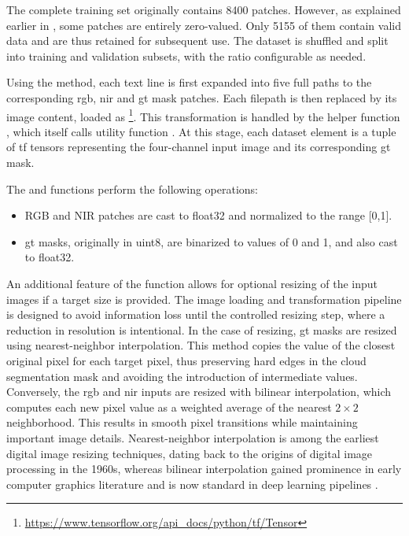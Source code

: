 {The complete training set originally contains 8400 patches. However, as explained earlier in , some patches are entirely zero-valued.
Only 5155 of them contain valid data and are thus retained for subsequent use.
The dataset is shuffled and split into training and validation subsets, with the ratio configurable as needed.

Using the  method, each text line is first expanded into five full paths to the corresponding \gls{rgb}, \gls{nir} and \gls{gt} mask patches.
Each filepath is then replaced by its image content, loaded as \footnote{\url{https://www.tensorflow.org/api_docs/python/tf/Tensor}}.
This transformation is handled by the helper function , which itself calls utility function .
At this stage, each dataset element is a tuple of \gls{tf} tensors representing the four-channel input image and its corresponding \gls{gt} mask.

The  and  functions perform the following operations:

\begin{itemize}
    \item RGB and NIR patches are cast to \gls{float32} and normalized to the range [0,1].
    \item \gls{gt} masks, originally in \gls{uint8}, are binarized to values of 0 and 1, and also cast to \gls{float32}.
\end{itemize}

An additional feature of the  function allows for optional resizing of the input images if a target size is provided.
The image loading and transformation pipeline is designed to avoid information loss until the controlled resizing step, where a reduction in resolution is intentional.
In the case of resizing, \gls{gt} masks are resized using nearest-neighbor interpolation. This method copies the value of the closest original pixel for each target pixel,
thus preserving hard edges in the cloud segmentation mask and avoiding the introduction of intermediate values.
Conversely, the \gls{rgb} and \gls{nir} inputs are resized with bilinear interpolation,
which computes each new pixel value as a weighted average of the nearest $2\times2$ neighborhood. This results in smooth pixel transitions while maintaining important image details.
Nearest-neighbor interpolation is among the earliest digital image resizing techniques, dating back to the origins of digital image processing in the 1960s,
whereas bilinear interpolation gained prominence in early computer graphics literature and is now standard in deep learning pipelines \cite{bilinearNearest1, bilinearNearest2}.

}
